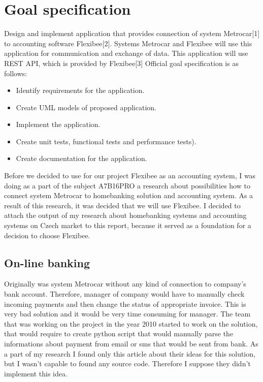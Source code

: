 \documentclass[11pt,twoside,a4paper]{book}
\begin{document}
\section{Goal specification}
Design and implement application that provides connection of system Metrocar[1] to accounting software Flexibee[2]. Systems Metrocar and Flexibee will use this application for communication and exchange of data. This application will use REST API, which is provided by Flexibee[3]
Official goal specification is as follows:
\begin{itemize}
\item Identify requirements for the application.
\item Create UML models of proposed application.
\item Implement the application.
\item Create unit tests, functional tests and performance tests).
\item Create documentation for the application.
\end{itemize}

Before we decided to use for our project Flexibee as an accounting system, I was doing as a part of the subject 
A7B16PRO a research about possibilities how to connect system Metrocar to homebanking solution and accounting system.
As a result of this research, it was decided that we will use Flexibee. I decided to attach the output of my research about homebanking systems and accounting systems on Czech market to this report, because it served as a foundation for a decision to 
choose Flexibee. 

\subsection{On-line banking}
Originally was system Metrocar without any kind of connection to company's bank account. Therefore, manager of company would 
have to manually check incoming payments and then change the status of appropriate invoice. This is very bad solution and it 
would be very time consuming for manager. The team that was working on the project in the year 2010 started to work on the solution, that would require to create python script that would manually parse the informations about payment from email or sms that would be sent from bank\cite{reserse2010}. As a part of my research I found only this article about their ideas for this solution, but I wasn't capable to found any source code. Therefore I suppose they didn't implement this idea. 
\end{document}
